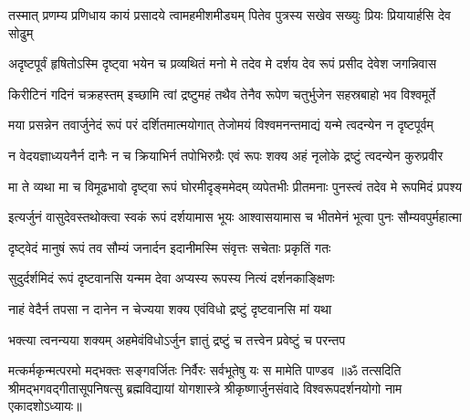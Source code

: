\fourlineindentedshloka
{तस्मात् प्रणम्य प्रणिधाय कायं}
{प्रसादये त्वामहमीशमीड्यम्}
{पितेव पुत्रस्य सखेव सख्युः}
{प्रियः प्रियायार्हसि देव सोढुम्}%

\fourlineindentedshloka
{अदृष्टपूर्वं हृषितोऽस्मि दृष्ट्वा}
{भयेन च प्रव्यथितं मनो मे}
{तदेव मे दर्शय देव रूपं}
{प्रसीद देवेश जगन्निवास}%

\fourlineindentedshloka
{किरीटिनं गदिनं चक्रहस्तम्}
{इच्छामि त्वां द्रष्टुमहं तथैव}
{तेनैव रूपेण चतुर्भुजेन}
{सहस्रबाहो भव विश्वमूर्ते}%

\fourlineindentedshloka
{मया प्रसन्नेन तवार्जुनेदं}
{रूपं परं दर्शितमात्मयोगात्}
{तेजोमयं विश्वमनन्तमाद्यं}
{यन्मे त्वदन्येन न दृष्टपूर्वम्}%

\fourlineindentedshloka
{न वेदयज्ञाध्ययनैर्न दानैः}
{न च क्रियाभिर्न तपोभिरुग्रैः}
{एवं रूपः शक्य अहं नृलोके}
{द्रष्टुं त्वदन्येन कुरुप्रवीर}%

\fourlineindentedshloka
{मा ते व्यथा मा च विमूढभावो}
{दृष्ट्वा रूपं घोरमीदृङ्ममेदम्}
{व्यपेतभीः प्रीतमनाः पुनस्त्वं}
{तदेव मे रूपमिदं प्रपश्य}%

\fourlineindentedshloka
{इत्यर्जुनं वासुदेवस्तथोक्त्वा}
{स्वकं रूपं दर्शयामास भूयः}
{आश्वासयामास च भीतमेनं}
{भूत्वा पुनः सौम्यवपुर्महात्मा}%

\twolineshloka
{दृष्ट्वेदं मानुषं रूपं तव सौम्यं जनार्दन}
{इदानीमस्मि संवृत्तः सचेताः प्रकृतिं गतः}%

\twolineshloka
{सुदुर्दर्शमिदं रूपं दृष्टवानसि यन्मम}
{देवा अप्यस्य रूपस्य नित्यं दर्शनकाङ्क्षिणः}%

\twolineshloka
{नाहं वेदैर्न तपसा न दानेन न चेज्यया}
{शक्य एवंविधो द्रष्टुं दृष्टवानसि मां यथा}%

\twolineshloka
{भक्त्या त्वनन्यया शक्यम् अहमेवंविधोऽर्जुन}
{ज्ञातुं द्रष्टुं च तत्त्वेन प्रवेष्टुं च परन्तप}%

\twolineshloka
{मत्कर्मकृन्मत्परमो मद्भक्तः सङ्गवर्जितः}
{निर्वैरः सर्वभूतेषु यः स मामेति पाण्डव}%
{॥ॐ तत्सदिति श्रीमद्भगवद्गीतासूपनिषत्सु ब्रह्मविद्यायां योगशास्त्रे श्रीकृष्णार्जुनसंवादे विश्वरूपदर्शनयोगो नाम एकादशोऽध्यायः॥}
